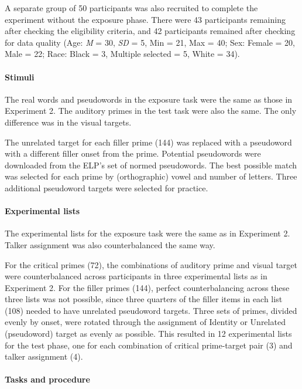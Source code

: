 \documentclass[
  12pt,
  twoside]{article}
\begin{document}
A separate group of 50 participants was also recruited to complete the experiment without the exposure phase.
There were 43 participants remaining after checking the eligibility criteria, and 42 participants remained after checking for data quality (Age: \emph{M} = 30, \emph{SD} = 5, Min = 21, Max = 40; Sex: Female = 20, Male = 22; Race: Black = 3, Multiple selected = 5, White = 34).

\hypertarget{stimuli}{%
\paragraph{Stimuli}\label{stimuli}}

The real words and pseudowords in the exposure task were the same as those in Experiment 2.
The auditory primes in the test task were also the same.
The only difference was in the visual targets.

The unrelated target for each filler prime (144) was replaced with a pseudoword with a different filler onset from the prime.
Potential pseudowords were downloaded from the ELP's set of normed pseudowords.
The best possible match was selected for each prime by (orthographic) vowel and number of letters.
Three additional pseudoword targets were selected for practice.

\hypertarget{experimental-lists}{%
\paragraph{Experimental lists}\label{experimental-lists}}

The experimental lists for the exposure task were the same as in Experiment 2.
Talker assignment was also counterbalanced the same way.

For the critical primes (72), the combinations of auditory prime and visual target were counterbalanced across participants in three experimental lists as in Experiment 2.
For the filler primes (144), perfect counterbalancing across these three lists was not possible, since three quarters of the filler items in each list (108) needed to have unrelated pseudoword targets.
Three sets of primes, divided evenly by onset, were rotated through the assignment of Identity or Unrelated (pseudoword) target as evenly as possible.
This resulted in 12 experimental lists for the test phase, one for each combination of critical prime-target pair (3) and talker assignment (4).

\hypertarget{tasks-and-procedure}{%
\paragraph{Tasks and procedure}\label{tasks-and-procedure}}
\end{document}
